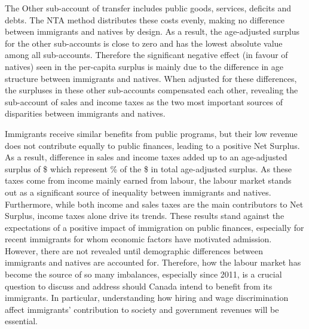 \vspace{0.7em}\par
The Other sub-account of transfer includes public goods, services, deficits and debts.
The NTA method distributes these costs evenly, making no difference between immigrants and natives by design.
As a result, the age-adjusted surplus for the other sub-accounts is close to zero and has the lowest absolute value among all sub-accounts.
Therefore the significant negative effect (in favour of natives) seen in the per-capita surplus is mainly due to the difference in age structure between immigrants and natives.
When adjusted for these differences, the surpluses in these other sub-accounts compensated each other, revealing the sub-account of sales and income taxes as the two most important sources of disparities between immigrants and natives.

\vspace{0.7em}\par
Immigrants receive similar benefits from public programs, but their low revenue does not contribute equally to public finances, leading to a positive Net Surplus.
As a result, difference in sales and income taxes added up to an age-adjusted surplus of \$ which represent \% of the \$ in total age-adjusted surplus.
As these taxes come from income mainly earned from labour, the labour market stands out as a significant source of inequality between immigrants and natives.
Furthermore, while both income and sales taxes are the main contributors to Net Surplus, income taxes alone drive its trends.
These results stand against the expectations of a positive impact of immigration on public finances, especially for recent immigrants for whom economic factors have motivated admission.
However, there are not revealed until demographic differences between immigrants and natives are accounted for.
Therefore, how the labour market has become the source of so many imbalances, especially since 2011, is a crucial question to discuss and address should Canada intend to benefit from its immigrants.
In particular, understanding how hiring and wage discrimination affect immigrants' contribution to society and government revenues will be essential.

















